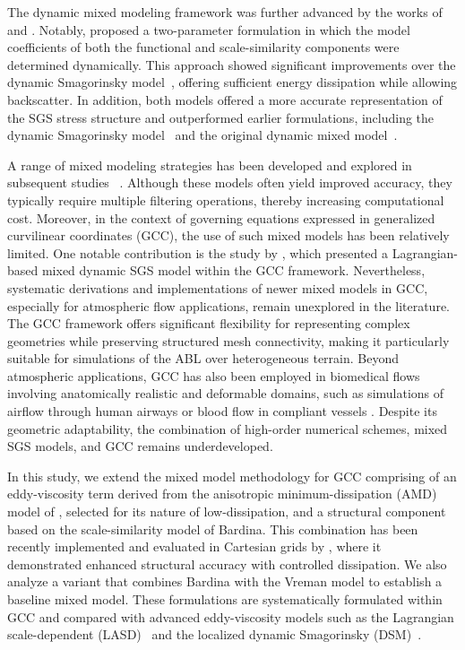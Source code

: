 \documentclass[final,3p]{elsarticle}
\begin{document}
The dynamic mixed modeling framework was further advanced by the works of \citet{vreman1994formulation} and \citet{salvetti1995priori}. Notably, \citet{salvetti1995priori} proposed a two-parameter formulation in which the model coefficients of both the functional and scale-similarity components were determined dynamically. This approach showed significant improvements over the dynamic Smagorinsky model~\cite{germano1991dynamic}, offering sufficient energy dissipation while allowing backscatter. In addition, both models offered a more accurate representation of the SGS stress structure and outperformed earlier formulations, including the dynamic Smagorinsky model~\cite{germano1991dynamic} and the original dynamic mixed model~\cite{zang1993dynamic}.

A range of mixed modeling strategies has been developed and explored in subsequent studies ~\cite{winckelmans2001explicit,vreman1994formulation,vreman1996large,horiuti1997new,vreman1997large,winckelmans1998testing}. Although these models often yield improved accuracy, they typically require multiple filtering operations, thereby increasing computational cost. Moreover, in the context of governing equations expressed in generalized curvilinear coordinates (GCC), the use of such mixed models has been relatively limited. One notable contribution is the study by \citet{armenio2000lagrangian}, which presented a Lagrangian-based mixed dynamic SGS model within the GCC framework. Nevertheless, systematic derivations and implementations of newer mixed models in GCC, especially for atmospheric flow applications, remain unexplored in the literature. The GCC framework offers significant flexibility for representing complex geometries while preserving structured mesh connectivity, making it particularly suitable for simulations of the ABL over heterogeneous terrain. Beyond atmospheric applications, GCC has also been employed in biomedical flows involving anatomically realistic and deformable domains, such as simulations of airflow through human airways or blood flow in compliant vessels \cite{Borazjani2008}. Despite its geometric adaptability, the combination of high-order numerical schemes, mixed SGS models, and GCC remains underdeveloped.

In this study, we extend the mixed model methodology for GCC comprising of an eddy-viscosity term derived from the anisotropic minimum-dissipation (AMD) model of \citet{rozema2015minimum}, selected for its nature of low-dissipation, and a structural component based on the scale-similarity model of Bardina. This combination has been recently implemented and evaluated in Cartesian grids by \citet{streher2021mixed}, where it demonstrated enhanced structural accuracy with controlled dissipation. We also analyze a variant that combines Bardina with the Vreman model to establish a baseline mixed model. These formulations are systematically formulated within GCC and compared with advanced eddy-viscosity models such as the Lagrangian scale-dependent (LASD)~\cite{meneveau1996lagrangian, porte2000scale, bou2005scale} and the localized dynamic Smagorinsky (DSM)~\cite{germano1991dynamic, ghosal1995dynamic}. 
\end{document}
